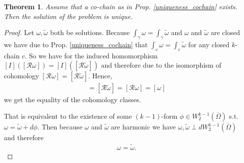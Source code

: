 \documentclass[12pt,a4paper]{article}
\newtheorem{theorem}{Theorem}
\theoremstyle{definition}
\newcommand{\omegabar}{\overline{\Omega}}
\newcommand{\rop}{\mathscr{R}} %
\begin{document}
\begin{theorem}
    Assume that a co-chain as in Prop. \ref{uniqueness_cochain}  exists. 
    Then the solution of the problem is unique.
\end{theorem}
\begin{proof}
    Let $\omega, \tilde{\omega}$ both be solutions. 
    Because $\int_\gamma \omega = \int_\gamma \tilde{\omega}$ and $\omega$ and
    $\tilde{\omega}$ are closed we have due to Prop. \ref{uniqueness_cochain} %
    that $\int_c \omega = \int_c \tilde{\omega}$ for any closed $k$-chain $c$.
    So we have for the induced homomorphism $[I]([\rop \omega]) = 
    [I]([\rop \tilde{\omega}])$ and therefore due to the isomorphism of 
    cohomology $[\rop \omega] = [\rop \tilde{\omega}]$. Hence,
    \begin{align*}
    [\tilde{\omega}] = [\rop \tilde{\omega}] = 
    [\rop \omega] = [\omega]
    \end{align*}
    we get the equality of the cohomology classes. \par
    
    That is equivalent to the
    existence of some $(k-1)$-form $\phi \in W^{k-1}_2(\omegabar)$ s.t.
    $\omega = \tilde{\omega} + d\phi$. Then because $\omega$ and 
    $\tilde{\omega}$ are harmonic we have 
    $\omega, \tilde{\omega} \perp dW^{k-1}_2(\omegabar)$ and therefore 
    \begin{align*}
    \omega = \tilde{\omega}.
    \end{align*}
\end{proof}
\end{document}
